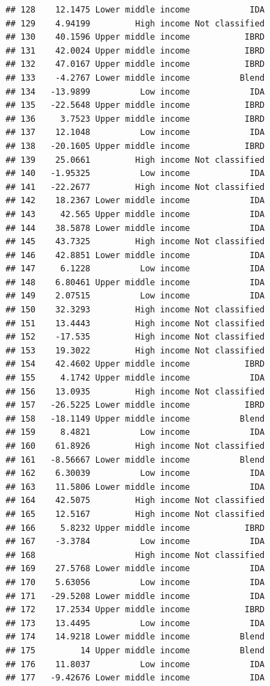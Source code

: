 \documentclass[
]{article}
\begin{document}
\begin{verbatim}
## 128    12.1475 Lower middle income            IDA
## 129    4.94199         High income Not classified
## 130    40.1596 Upper middle income           IBRD
## 131    42.0024 Upper middle income           IBRD
## 132    47.0167 Upper middle income           IBRD
## 133    -4.2767 Lower middle income          Blend
## 134   -13.9899          Low income            IDA
## 135   -22.5648 Upper middle income           IBRD
## 136     3.7523 Upper middle income           IBRD
## 137    12.1048          Low income            IDA
## 138   -20.1605 Upper middle income           IBRD
## 139    25.0661         High income Not classified
## 140   -1.95325          Low income            IDA
## 141   -22.2677         High income Not classified
## 142    18.2367 Lower middle income            IDA
## 143     42.565 Upper middle income            IDA
## 144    38.5878 Lower middle income            IDA
## 145    43.7325         High income Not classified
## 146    42.8851 Lower middle income            IDA
## 147     6.1228          Low income            IDA
## 148    6.80461 Upper middle income            IDA
## 149    2.07515          Low income            IDA
## 150    32.3293         High income Not classified
## 151    13.4443         High income Not classified
## 152    -17.535         High income Not classified
## 153    19.3022         High income Not classified
## 154    42.4602 Upper middle income           IBRD
## 155     4.1742 Upper middle income            IDA
## 156    13.0935         High income Not classified
## 157   -26.5225 Lower middle income           IBRD
## 158   -18.1149 Upper middle income          Blend
## 159     8.4821          Low income            IDA
## 160    61.8926         High income Not classified
## 161   -8.56667 Lower middle income          Blend
## 162    6.30039          Low income            IDA
## 163    11.5806 Lower middle income            IDA
## 164    42.5075         High income Not classified
## 165    12.5167         High income Not classified
## 166     5.8232 Upper middle income           IBRD
## 167    -3.3784          Low income            IDA
## 168                    High income Not classified
## 169    27.5768 Lower middle income            IDA
## 170    5.63056          Low income            IDA
## 171   -29.5208 Lower middle income            IDA
## 172    17.2534 Upper middle income           IBRD
## 173    13.4495          Low income            IDA
## 174    14.9218 Lower middle income          Blend
## 175         14 Upper middle income          Blend
## 176    11.8037          Low income            IDA
## 177   -9.42676 Lower middle income            IDA

\end{verbatim}
\end{document}
